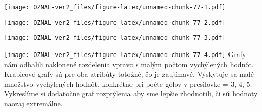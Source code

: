 \documentclass[
]{article}
\newenvironment{Shaded}{\begin{snugshade}}{\end{snugshade}}
\newcommand{\AttributeTok}[1]{\textcolor[rgb]{0.77,0.63,0.00}{#1}}
\newcommand{\ConstantTok}[1]{\textcolor[rgb]{0.00,0.00,0.00}{#1}}
\newcommand{\DecValTok}[1]{\textcolor[rgb]{0.00,0.00,0.81}{#1}}
\newcommand{\FloatTok}[1]{\textcolor[rgb]{0.00,0.00,0.81}{#1}}
\newcommand{\FunctionTok}[1]{\textcolor[rgb]{0.00,0.00,0.00}{#1}}
\newcommand{\NormalTok}[1]{#1}
\newcommand{\SpecialCharTok}[1]{\textcolor[rgb]{0.00,0.00,0.00}{#1}}
\newcommand{\StringTok}[1]{\textcolor[rgb]{0.31,0.60,0.02}{#1}}
\begin{document}
\texttt{[image: OZNAL-ver2\_files/figure-latex/unnamed-chunk-77-1.pdf]}

\begin{Shaded}
\end{Shaded}

\texttt{[image: OZNAL-ver2\_files/figure-latex/unnamed-chunk-77-2.pdf]}

\begin{Shaded}
\end{Shaded}

\texttt{[image: OZNAL-ver2\_files/figure-latex/unnamed-chunk-77-3.pdf]}

\begin{Shaded}
\end{Shaded}

\texttt{[image: OZNAL-ver2\_files/figure-latex/unnamed-chunk-77-4.pdf]}
Grafy nám odhalili naklonené rozdelenia vpravo s malým počtom
vychýlených hodnôt. Krabicové grafy sú pre oba atribúty totožné, čo je
zaujímavé. Vyskytuje sa malé množstvo vychýlených hodnôt, konkrétne pri
počte gólov v presilovke = 3, 4, 5. Vykreslíme si dodatočne graf
rozptýlenia aby sme lepšie zhodnotili, či sú hodnoty naozaj extremálne.

\begin{Shaded}
\end{Shaded}
\end{document}

